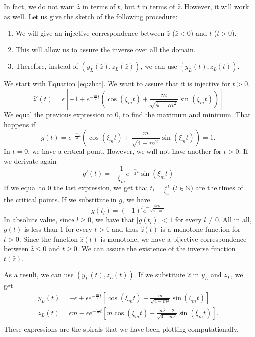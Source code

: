 \documentclass[a4paper,preprint,11pt]{article}
\begin{document}
In fact, we do not want $\hat{z}$ in terms of $t$, but $t$ in terms of $\hat{z}$. However, it will work as well. Let us give the sketch of the following procedure:
\begin{enumerate}
    \item We will give an injective correspondence between $\hat{z}$ ($\hat{z}<0$) and $t$ ($t>0$).
    \item This will allow us to assure the inverse over all the domain.
    \item Therefore, instead of $(y_L(\hat{z}),z_L(\hat{z}))$, we can use $(y_L(t),z_L(t))$.
\end{enumerate}
We start with Equation \ref{eq:zhat}. We want to assure that it is injective for $t>0$.
$$
\hat{z}'(t) = \epsilon\left[-1+e^{-\frac{m}{2}t}
\left(
\cos(\xi_mt) + \frac{m}{\sqrt{4-m^2}}\sin(\xi_mt)
\right) \right]
$$
We equal the previous expression to $0$, to find the maximum and minimum. That happens if
$$
g(t)=e^{-\frac{m}{2}t}
\left(
\cos(\xi_mt) + \frac{m}{\sqrt{4-m^2}}\sin(\xi_mt)
\right) = 1.
$$
In $t=0$, we have a critical point. However, we will not have another for $t>0$. If we derivate again
$$
g'(t) = -\frac{1}{\xi_m}e^{-\frac{m}{2}t}\sin(\xi_mt)
$$
If we equal to $0$ the last expression, we get that $ t_l = \frac{\pi l}{\xi_m}$ ($l\in\mathbb{N}$) are the times of the critical points. If we substitute in $g$, we have
$$
g(t_l) = (-1)^le^{-\frac{m\pi l}{\sqrt{4-m^2}}}
$$
In absolute value, since $l \geq 0$, we have that $\lvert g(t_l)\rvert <1$ for every $l\neq 0$. All in all, $g(t)$ is less than $1$ for every $t>0$ and thus $\hat{z}(t)$ is a monotone function for $t>0$. Since the function $\hat{z}(t)$ is monotone, we have a bijective correspondence between $\hat{z}\leq 0$ and $t\geq 0$. We can assure the existence of the inverse function $t(\hat{z})$.

As a result, we can use $(y_L(t),z_L(t))$. If we substitute $\hat{z}$ in $y_L$ and $z_L$, we get
$$
\begin{array}{l}
y_L(t) = -\epsilon + \epsilon e^{-\frac{m}{2}t}
\left[
\cos(\xi_m t) + \frac{m}{\sqrt{4-m^2}}\sin(\xi_m t)
\right] \\
z_L(t) = \epsilon m - \epsilon e^{-\frac{m}{2}t}
\left[
m\cos(\xi_m t) + \frac{m^2-2}{\sqrt{4-m^2}}\sin(\xi_m t)
\right]. \\
\end{array}
$$
These expressions are the spirals that we have been plotting computationally.
\end{document}
